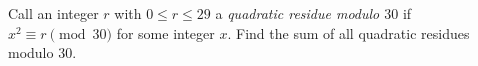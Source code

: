 Call an integer $r$ with $0\le r\le29$ a \emph{quadratic residue modulo $30$} if $x^2\equiv r\pmod{30}$ for some integer $x$. Find the sum of all quadratic residues modulo $30$.
